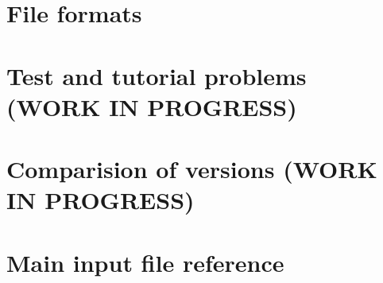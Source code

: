 \documentclass[12pt,a4paper]{report}
\begin{document}










%
%


\chapter{File formats}





% 
%   


\chapter{Test and tutorial problems (WORK IN PROGRESS)}
 \label{chapter:tests}
 
% 
 \chapter{Comparision of versions (WORK IN PROGRESS)}
 \label{chapter:version_comparision}
 

\chapter{Main input file reference}
\label{chapter:input-tree-reference}






\end{document}
